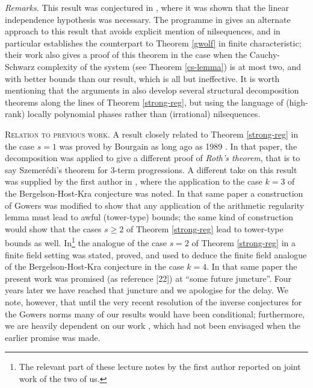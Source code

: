 \documentclass[11pt,reqno]{amsart}
\numberwithin{equation}{section}
\theoremstyle{plain}
\theoremstyle{definition}
\renewcommand{\geq}{\geqslant}
\newcommand\1{{\bf 1}}
\newcommand\2{{\bf 2}}
\begin{document}
\emph{Remarks.}  This result was conjectured in \cite{gowers-wolf-1}, where it was shown that the linear independence hypothesis was necessary.  The programme in \cite{gowers-wolf-1,gowers-wolf-2,gowers-wolf-3} gives an alternate approach to this result that avoids explicit mention of nilsequences, and in particular establishes the counterpart to Theorem \ref{gwolf} in finite characteristic; their work also gives a proof of this theorem in the case when the Cauchy-Schwarz complexity of the system (see Theorem \ref{cs-lemma}) is at most two, and with better bounds than our result, which is all but ineffective.  It is worth mentioning that the arguments in \cite{gowers-wolf-1,gowers-wolf-2,gowers-wolf-3} also develop several structural decomposition theorems along the lines of Theorem \ref{strong-reg}, but using the language of (high-rank) locally polynomial phases rather than (irrational) nilsequences.  \vspace{11pt}

\textsc{Relation to previous work.} A result closely related to Theorem \ref{strong-reg} in the case $s = 1$ was proved by Bourgain as long ago as 1989 \cite{bourgain}. In that paper, the decomposition was applied to give a different proof of \emph{Roth's theorem}, that is to say Szemer\'edi's theorem for $3$-term progressions. A different take on this result was supplied by the first author in \cite{green-regularity}, where the application to the case $k = 3$ of the Bergelson-Host-Kra conjecture was noted. In that same paper a construction of Gowers \cite{gowers-lower} was modified to show that any application of the arithmetic regularity lemma must lead to awful (tower-type) bounds; the same kind of construction would show that the cases $s \geq 2$ of Theorem \ref{strong-reg} lead to tower-type bounds as well. In\footnote{The relevant part of these lecture notes by the first author reported on joint work of the two of us.} \cite{green-montreal} the analogue of the case $s = 2$ of Theorem \ref{strong-reg} in a finite field setting was stated, proved, and used to deduce the finite field analogue of the Bergelson-Host-Kra conjecture in the case $k = 4$. In that same paper the present work was promised (as reference [22]) at ``some future juncture''. Four years later we have reached that juncture and we apologise for the delay. We note, however, that until the very recent resolution of the inverse conjectures for the Gowers norms \cite{green-tao-ziegler-u4inverse,gtz-announcement} many of our results would have been conditional; furthermore, we are heavily dependent on our work \cite{green-tao-nilratner}, which had not been envisaged when the earlier promise was made.
\end{document}
